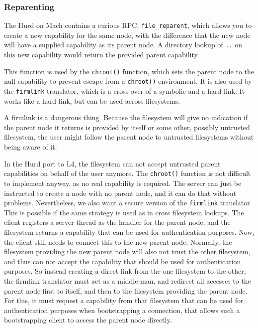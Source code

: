 \documentclass[9pt,a4paper]{extarticle}
\begin{document}
\subsubsection{Reparenting}
\label{reparenting}

The Hurd on Mach contains a curious RPC, \verb/file_reparent/, which
allows you to create a new capability for the same node, with the
difference that the new node will have a supplied capability as its
parent node.  A directory lookup of \texttt{..} on this new capability
would return the provided parent capability.

This function is used by the \texttt{chroot()} function, which sets
the parent node to the null capability to prevent escape from a
\texttt{chroot()} environment.  It is also used by the
\texttt{firmlink} translator, which is a cross over of a symbolic and
a hard link: It works like a hard link, but can be used across
filesystems.

A firmlink is a dangerous thing.  Because the filesystem will give no
indication if the parent node it returns is provided by itself or some
other, possibly untrusted filesystem, the user might follow the parent
node to untrusted filesystems without being aware of it.

In the Hurd port to L4, the filesystem can not accept untrusted parent
capabilities on behalf of the user anymore.  The \texttt{chroot()}
function is not difficult to implement anyway, as no real capability
is required.  The server can just be instructed to create a node with
no parent node, and it can do that without problems.  Nevertheless, we
also want a secure version of the \texttt{firmlink} translator.  This
is possible if the same strategy is used as in cross filesystem
lookups.  The client registers a server thread as the handler for the
parent node, and the filesystem returns a capability that can be used
for authentication purposes.  Now, the client still needs to connect
this to the new parent node.  Normally, the filesystem providing the
new parent node will also not trust the other filesystem, and thus can
not accept the capability that should be used for authentication
purposes.  So instead creating a direct link from the one filesystem
to the other, the firmlink translator must act as a middle man, and
redirect all accesses to the parent node first to itself, and then to
the filesystem providing the parent node.  For this, it must request a
capability from that filesystem that can be used for authentication
purposes when bootstrapping a connection, that allows such a
bootstrapping client to access the parent node directly.
\end{document}
